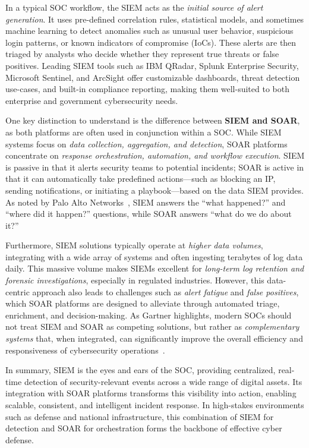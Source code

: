 In a typical SOC workflow, the SIEM acts as the \textit{initial source of alert generation}. It uses pre-defined correlation rules, statistical models, and sometimes machine learning to detect anomalies such as unusual user behavior, suspicious login patterns, or known indicators of compromise (IoCs). These alerts are then triaged by analysts who decide whether they represent true threats or false positives. Leading SIEM tools such as IBM QRadar, Splunk Enterprise Security, Microsoft Sentinel, and ArcSight offer customizable dashboards, threat detection use-cases, and built-in compliance reporting, making them well-suited to both enterprise and government cybersecurity needs.

One key distinction to understand is the difference between \textbf{SIEM and SOAR}, as both platforms are often used in conjunction within a SOC. While SIEM systems focus on \textit{data collection, aggregation, and detection}, SOAR platforms concentrate on \textit{response orchestration, automation, and workflow execution}. SIEM is passive in that it alerts security teams to potential incidents; SOAR is active in that it can automatically take predefined actions—such as blocking an IP, sending notifications, or initiating a playbook—based on the data SIEM provides. As noted by Palo Alto Networks~\cite{paloalto}, SIEM answers the ``what happened?'' and ``where did it happen?'' questions, while SOAR answers ``what do we do about it?''

Furthermore, SIEM solutions typically operate at \textit{higher data volumes}, integrating with a wide array of systems and often ingesting terabytes of log data daily. This massive volume makes SIEMs excellent for \textit{long-term log retention and forensic investigations}, especially in regulated industries. However, this data-centric approach also leads to challenges such as \textit{alert fatigue} and \textit{false positives}, which SOAR platforms are designed to alleviate through automated triage, enrichment, and decision-making. As Gartner highlights, modern SOCs should not treat SIEM and SOAR as competing solutions, but rather as \textit{complementary systems} that, when integrated, can significantly improve the overall efficiency and responsiveness of cybersecurity operations~\cite{gartner-siem-soar}.

In summary, SIEM is the eyes and ears of the SOC, providing centralized, real-time detection of security-relevant events across a wide range of digital assets. Its integration with SOAR platforms transforms this visibility into action, enabling scalable, consistent, and intelligent incident response. In high-stakes environments such as defense and national infrastructure, this combination of SIEM for detection and SOAR for orchestration forms the backbone of effective cyber defense.

